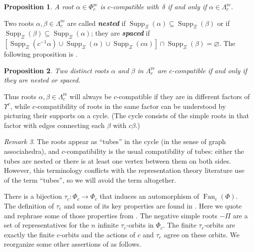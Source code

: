 \documentclass[10pt]{article}
\newtheorem{proposition}{Proposition}[section]
\theoremstyle{definition}
\theoremstyle{remark}
\newtheorem{remark}[proposition]{Remark}
\numberwithin{equation}{section}
\newcommand{\newword}[1]{\textbf{\emph{#1}}}
\newcommand{\0}{{\mathbf{0}}}
\newcommand{\Fan}{\operatorname{Fan}}
\newcommand{\re}{\mathrm{re}}
\newcommand{\RSChar}{\Phi}
\newcommand{\RS}{\RSChar}
\newcommand{\SimplesChar}{\Pi}
\newcommand{\Simples}{\SimplesChar}
\newcommand{\RSTChar}{\Upsilon}
\newcommand{\RST}[1]{\RSTChar^{#1}}
\newcommand{\SimplesTChar}{\Xi}
\newcommand{\SuppT}{\operatorname{Supp}_\SimplesTChar}
\newcommand{\AP}[1]{\RS_{#1}}
\newcommand{\APre}[1]{\AP{#1}^\re}
\newcommand{\APTChar}{\Lambda}
\newcommand{\APT}[1]{\APTChar_{#1}}
\newcommand{\APTre}[1]{\APT{#1}^\re}
\begin{document}
\begin{proposition}\label{delta c compat}
A root $\alpha\in\APre{c}$ is $c$-compatible with~$\delta$ if and only if $\alpha\in\APTre{c}$.
\end{proposition}

Two roots $\alpha,\beta\in\APTre{c}$ are called \newword{nested} if $\SuppT(\alpha)\subseteq\SuppT(\beta)$ or if $\SuppT(\beta)\subseteq\SuppT(\alpha)$; they are \newword{spaced} if $[\SuppT(c^{-1}\alpha)\cup\SuppT(\alpha)\cup\SuppT(c\alpha)]\cap\SuppT(\beta)=\varnothing$.
The following proposition is \cite[Proposition~5.12]{affdenom}.

\begin{proposition}\label{compatible in tubes}
Two distinct roots $\alpha$ and $\beta$ in $\APTre{c}$ are $c$-compatible if and only if they are nested or spaced.
\end{proposition}

Thus roots $\alpha,\beta\in\APTre{c}$ will always be $c$-compatible if they are in different factors of $\RST{c}$, while
$c$-compatibility of roots in the same factor can be understood by picturing their supports on a cycle.
(The cycle consists of the simple roots in that factor with edges connecting each $\beta$ with $c\beta$.)

\begin{remark}
  The roots appear as ``tubes'' in the cycle (in the sense of graph associahedra), and $c$-compatibility is the usual compatibility of tubes:
  either the tubes are nested or there is at least one vertex between them on both sides.
  However, this terminology conflicts with the representation theory literature use of the term ``tubes'', so we will avoid the term altogether.
\end{remark}

There is a bijection $\tau_c:\AP{c}\to\AP{c}$ that induces an automorphism of $\Fan_c(\RS)$.
The definition of $\tau_c$ and some of its key properties are found in \cite[Section~3]{affdenom}.
Here we quote and rephrase some of those properties from \cite[Proposition~3.12]{affdenom}.
The negative simple roots $-\Simples$ are a set of representatives for the $n$ infinite $\tau_c$-orbits in $\AP{c}$.
The finite $\tau_c$-orbits are exactly the finite $c$-orbits and the actions of $c$ and $\tau_c$ agree on these orbits.
We reorganize some other assertions of \cite[Proposition~3.12]{affdenom} as follows.
\end{document}
